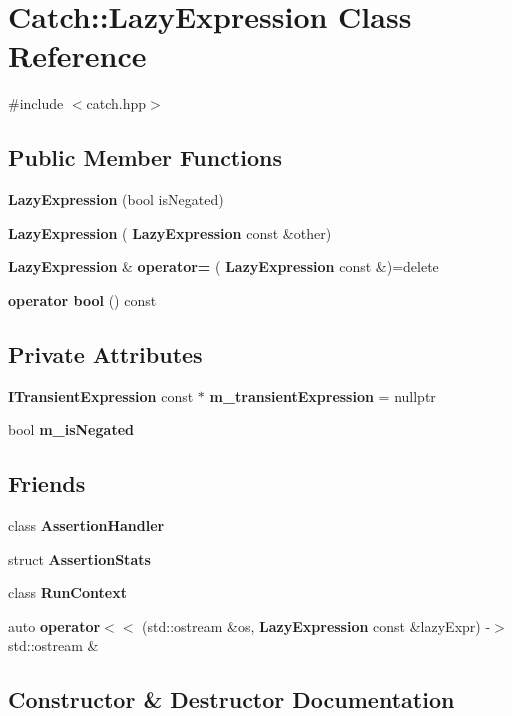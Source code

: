 \section{Catch\+::Lazy\+Expression Class Reference}
\label{class_catch_1_1_lazy_expression}


{\ttfamily \#include $<$catch.\+hpp$>$}

\subsection*{Public Member Functions}
\begin{DoxyCompactItemize}
\item 
\textbf{ Lazy\+Expression} (bool is\+Negated)
\item 
\textbf{ Lazy\+Expression} (\textbf{ Lazy\+Expression} const \&other)
\item 
\textbf{ Lazy\+Expression} \& \textbf{ operator=} (\textbf{ Lazy\+Expression} const \&)=delete
\item 
\textbf{ operator bool} () const
\end{DoxyCompactItemize}
\subsection*{Private Attributes}
\begin{DoxyCompactItemize}
\item 
\textbf{ I\+Transient\+Expression} const  $\ast$ \textbf{ m\+\_\+transient\+Expression} = nullptr
\item 
bool \textbf{ m\+\_\+is\+Negated}
\end{DoxyCompactItemize}
\subsection*{Friends}
\begin{DoxyCompactItemize}
\item 
class \textbf{ Assertion\+Handler}
\item 
struct \textbf{ Assertion\+Stats}
\item 
class \textbf{ Run\+Context}
\item 
auto \textbf{ operator$<$$<$} (std\+::ostream \&os, \textbf{ Lazy\+Expression} const \&lazy\+Expr) -\/$>$ std\+::ostream \&
\end{DoxyCompactItemize}


\subsection{Constructor \& Destructor Documentation}
\mbox{\label{class_catch_1_1_lazy_expression_a47186c2487bd4bf871e870ba8048553a}} 
